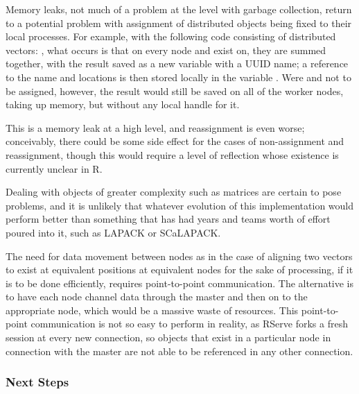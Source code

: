 Memory leaks, not much of a problem at the \R level with garbage
collection, return to a potential problem with assignment of distributed
objects being fixed to their local \R processes. For example, with the
following code consisting of distributed vectors:
, what occurs is that on every node
 and  exist on, they are summed together, with the
result saved as a new variable with a UUID name; a reference to the name
and locations is then stored locally in the variable . Were
 and  not to be assigned, however, the result would
still be saved on all of the worker nodes, taking up memory, but without
any local handle for it.

This is a memory leak at a high level, and reassignment is even worse;
conceivably, there could be some side effect for the cases of
non-assignment and reassignment, though this would require a level of
reflection whose existence is currently unclear in R.

Dealing with objects of greater complexity such as matrices are certain
to pose problems, and it is unlikely that whatever evolution of this
implementation would perform better than something that has had years
and teams worth of effort poured into it, such as LAPACK or SCaLAPACK.

The need for data movement between nodes as in the case of aligning two
vectors to exist at equivalent positions at equivalent nodes for the
sake of processing, if it is to be done efficiently, requires
point-to-point communication. The alternative is to have each node
channel data through the master and then on to the appropriate node,
which would be a massive waste of resources. This point-to-point
communication is not so easy to perform in reality, as RServe forks a
fresh \R session at every new connection, so objects that exist in a
particular node in connection with the master are not able to be
referenced in any other connection.

\subsubsection{Next Steps}\label{next-steps}


